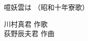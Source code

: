 \documentclass[10pt,b5j]{tarticle} %
\begin{document}
\begin{minipage}[c]{0.7\hsize} %
    \begin{center}
        {\LARGE
            噫妖雲は %
        }
        {\small 
            （昭和十年寮歌） %
        }
    \end{center}
\end{minipage}
\begin{minipage}[c]{0.3\hsize} %
    \begin{flushright} %
        川村真君 作歌\\荻野辰夫君 作曲 %
    \end{flushright}
\end{minipage}
\end{document}

